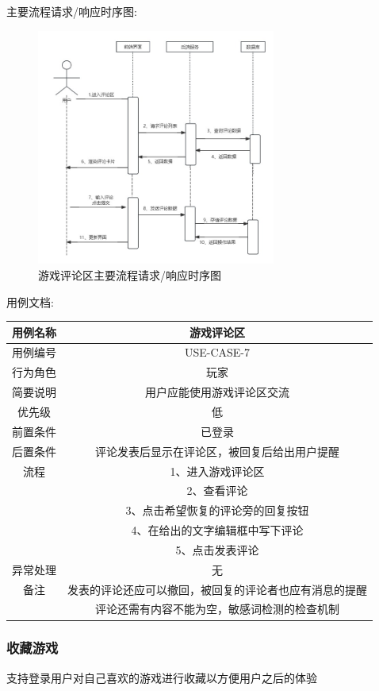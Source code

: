 \documentclass[12pt]{ctexart} %
\begin{document}
主要流程请求/响应时序图:
\begin{figure}[ht]
  \centering
  \includegraphics[width=0.7\textwidth]{yongli7.jpg}
  \caption{游戏评论区主要流程请求/响应时序图}
\end{figure}
用例文档:

\begin{tabular}{|c|c|}
  \hline
  用例名称& 游戏评论区\\
  \hline
  用例编号 & USE-CASE-7\\
  \hline
  行为角色 & 玩家\\
  \hline
  简要说明 & 用户应能使用游戏评论区交流\\
  \hline
  优先级 & 低\\
  \hline
  前置条件 & 已登录\\
  \hline
  后置条件 & 评论发表后显示在评论区，被回复后给出用户提醒\\
  \hline
  流程 & 1、进入游戏评论区\\
      &  2、查看评论\\
      &  3、点击希望恢复的评论旁的回复按钮\\
      &  4、在给出的文字编辑框中写下评论\\
      &  5、点击发表评论\\
  \hline
  异常处理 & 无\\
  \hline
  备注 & 发表的评论还应可以撤回，被回复的评论者也应有消息的提醒\\
       & 评论还需有内容不能为空，敏感词检测的检查机制\\
  \hline
\end{tabular}

\subsubsection{收藏游戏}
支持登录用户对自己喜欢的游戏进行收藏以方便用户之后的体验
\end{document}
